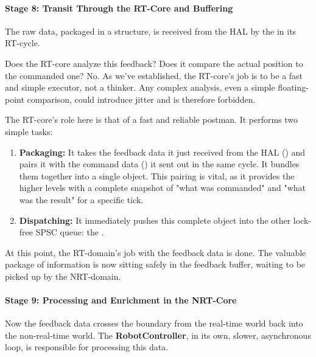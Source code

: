 \paragraph{Stage 8: Transit Through the RT-Core and Buffering}
The raw data, packaged in a  structure, is received from the HAL by the  in its RT-cycle.

Does the RT-core analyze this feedback? Does it compare the actual position to the commanded one? No. As we've established, the RT-core's job is to be a fast and simple executor, not a thinker. Any complex analysis, even a simple floating-point comparison, could introduce jitter and is therefore forbidden.

The RT-core's role here is that of a fast and reliable postman. It performs two simple tasks:
\begin{enumerate}
    \item \textbf{Packaging:} It takes the feedback data it just received from the HAL () and pairs it with the command data () it sent out in the same cycle. It bundles them together into a single  object. This pairing is vital, as it provides the higher levels with a complete snapshot of "what was commanded" and "what was the result" for a specific tick.
    \item \textbf{Dispatching:} It immediately pushes this complete  object into the other lock-free SPSC queue: the \textbf{}.
\end{enumerate}

At this point, the RT-domain's job with the feedback data is done. The valuable package of information is now sitting safely in the feedback buffer, waiting to be picked up by the NRT-domain.


\paragraph{Stage 9: Processing and Enrichment in the NRT-Core}
Now the feedback data crosses the boundary from the real-time world back into the non-real-time world. The \textbf{RobotController}, in its own, slower, asynchronous loop, is responsible for processing this data.

